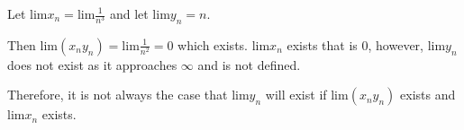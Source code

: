 \documentclass[addpoints]{exam}
\begin{document}
\begin{questions}
\begin{parts}
\begin{solution}
            Let lim$x_n = \text{lim}\frac{1}{n^3}$ and let lim$y_n = n$.

            Then lim$(x_n y_n) = \text{lim}\frac{1}{n^2} = 0$ which exists. lim$ x_n $ exists that is 0, however, lim$y_n$ does not exist as it approaches $\infty$ and is not defined.
            
            Therefore, it is not always the case that lim$y_n$ will exist if lim$(x_ny_n)$ exists and lim$x_n$ exists.
        \end{solution}
    \end{parts}
\end{questions}
\end{document}
